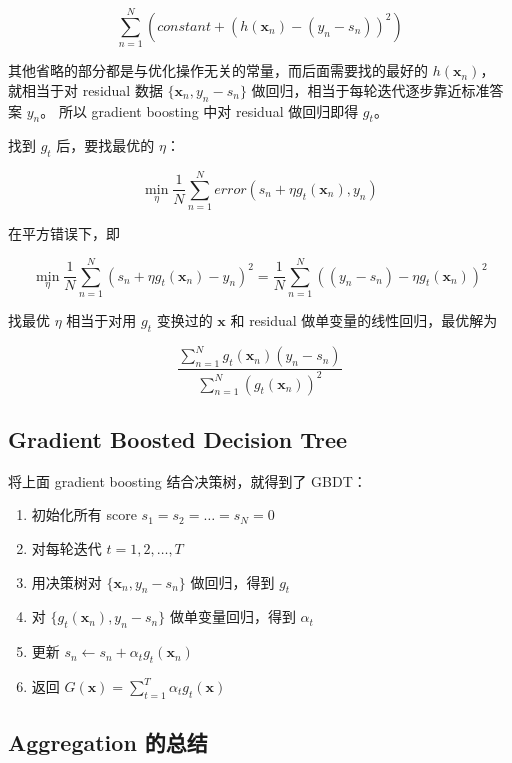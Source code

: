 \documentclass[a4paper]{article}
\begin{document}
$$\sum_{n=1}^{N} \left ( constant + (h(\mathbf{x}_n) - (y_n - s_n))^2 \right )$$

其他省略的部分都是与优化操作无关的常量，而后面需要找的最好的 $h(\mathbf{x}_n)$，
就相当于对 residual 数据 $\{\mathbf{x}_n, y_n - s_n\}$ 做回归，相当于每轮迭代逐步靠近标准答案 $y_n$。
所以 gradient boosting 中对 residual 做回归即得 $g_t$。

找到 $g_t$ 后，要找最优的 $\eta$：

$$\operatorname*{min}_{\eta} \frac{1}{N}\sum_{n=1}^{N} error \left ( s_n + \eta g_t(\mathbf{x}_n), y_n \right )$$

在平方错误下，即

$$\operatorname*{min}_{\eta} \frac{1}{N}\sum_{n=1}^{N} \left ( s_n + \eta g_t(\mathbf{x}_n) - y_n \right )^2 = \frac{1}{N}\sum_{n=1}^{N}((y_n - s_n) - \eta g_t(\mathbf{x}_n))^2$$

找最优 $\eta$ 相当于对用 $g_t$ 变换过的 $\mathbf{x}$ 和 residual 做单变量的线性回归，最优解为

$$\frac{\displaystyle \sum_{n=1}^{N}g_t(\mathbf{x}_n)(y_n - s_n)}{\displaystyle \sum_{n=1}^{N}(g_t(\mathbf{x}_n))^2}$$

\subsection{Gradient Boosted Decision Tree}
将上面 gradient boosting 结合决策树，就得到了 GBDT：

\begin{enumerate}
  \item 初始化所有 score $s_1 = s_2 = \dots = s_N = 0$ \\
  \item 对每轮迭代 $t=1,2,\dots,T$ \\
  \item 用决策树对 $\{\mathbf{x}_n, y_n - s_n\}$ 做回归，得到 $g_t$ \\
  \item 对 $\{g_t(\mathbf{x}_n), y_n - s_n\}$ 做单变量回归，得到 $\alpha_t$ \\
  \item 更新 $s_n \leftarrow s_n + \alpha_t g_t(\mathbf{x}_n)$
  \item 返回 $\displaystyle G(\mathbf{x}) = \sum_{t=1}^{T}\alpha_t g_t(\mathbf{x})$
\end{enumerate}

\subsection{Aggregation 的总结}
\end{document}

